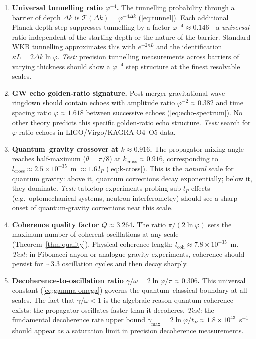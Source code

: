 \documentclass[12pt,a4paper]{article}
\begin{document}
\begin{enumerate}
\item \textbf{Universal tunnelling ratio $\varphi^{-4}$.} The tunnelling probability through a barrier of depth $\Delta k$ is $\mathcal{T}(\Delta k) = \varphi^{-4\Delta k}$ (\ref{eq:tunnel}).  Each additional Planck-depth step suppresses tunnelling by a factor $\varphi^{-4} \approx 0.146$---a \emph{universal} ratio independent of the starting depth or the nature of the barrier.  Standard WKB tunnelling approximates this with $e^{-2\kappa L}$ and the identification $\kappa L = 2\Delta k\ln\varphi$.  \textit{Test:} precision tunnelling measurements across barriers of varying thickness should show a $\varphi^{-4}$ step structure at the finest resolvable scales.

\item \textbf{GW echo golden-ratio signature.} Post-merger gravitational-wave ringdown should contain echoes with amplitude ratio $\varphi^{-2} \approx 0.382$ and time spacing ratio $\varphi \approx 1.618$ between successive echoes (\ref{eq:echo-spectrum}).  No other theory predicts this specific golden-ratio echo structure.  \textit{Test:} search for $\varphi$-ratio echoes in LIGO/Virgo/KAGRA O4--O5 data.

\item \textbf{Quantum--gravity crossover at $k \approx 0.916$.} The propagator mixing angle reaches half-maximum ($\theta = \pi/8$) at $k_{\mathrm{cross}} \approx 0.916$, corresponding to $l_{\mathrm{cross}} \approx 2.5 \times 10^{-35}$~m $\approx 1.6\,l_P$ (\ref{eq:k-cross}).  This is the \emph{natural} scale for quantum gravity: above it, quantum corrections decay exponentially; below it, they dominate.  \textit{Test:} tabletop experiments probing sub-$l_P$ effects (e.g.\ optomechanical systems, neutron interferometry) should see a sharp onset of quantum-gravity corrections near this scale.

\item \textbf{Coherence quality factor $Q \approx 3.264$.} The ratio $\pi/(2\ln\varphi)$ sets the maximum number of coherent oscillations at any scale (Theorem~\ref{thm:quality}).  Physical coherence length: $l_{\mathrm{coh}} \approx 7.8 \times 10^{-35}$~m.  \textit{Test:} in Fibonacci-anyon or analogue-gravity experiments, coherence should persist for $\sim 3.3$ oscillation cycles and then decay sharply.

\item \textbf{Decoherence-to-oscillation ratio $\gamma/\omega = 2\ln\varphi/\pi \approx 0.306$.} This universal constant (\ref{eq:gamma-omega}) governs the quantum--classical boundary at all scales.  The fact that $\gamma/\omega < 1$ is the algebraic reason quantum coherence exists: the propagator oscillates faster than it decoheres.  \textit{Test:} the fundamental decoherence rate upper bound $\gamma_{\max} = 2\ln\varphi/t_P \approx 1.8 \times 10^{43}$~s$^{-1}$ should appear as a saturation limit in precision decoherence measurements.


\end{enumerate}
\end{document}
